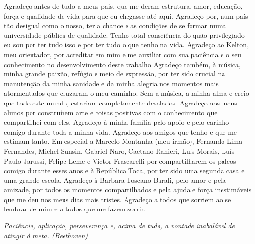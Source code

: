 \documentclass[
	12pt,				%
	openright,			%
	oneside,			%
	a4paper,			%
	english,			%
	french,				%
	spanish,			%
	brazil				%
	]{abntex2}
\begin{document}
\begin{agradecimentos}
Agradeço antes de tudo a meus pais, que me deram estrutura, amor, educação,
força e qualidade de vida para que eu chegasse até aqui. Agradeço por, num país
tão desigual como o nosso, ter a chance e as condições de se formar numa
universidade pública de qualidade. Tenho total consciência do quão privilegiado
eu sou por ter tudo isso e por ter tudo o que tenho na vida. Agradeço ao Kelton,
meu orientador, por acreditar em mim e me auxiliar com sua paciência e o seu
conhecimento no desenvolvimento deste trabalho Agradeço também, à música, minha
grande paixão, refúgio e meio de expressão, por ter sido crucial na manutenção
da minha sanidade e da minha alegria nos momentos mais atormentados que cruzaram
o meu caminho. Sem a música, a minha alma e creio que todo este mundo, estariam
completamente desolados. Agradeço aos meus alunos por construírem arte e coisas
positivas com o conhecimento que compartilhei com eles. Agradeço à minha família
pelo apoio e pelo carinho comigo durante toda a minha vida. Agradeço aos amigos
que tenho e que me estimam tanto. Em especial a Marcelo Montanha (meu irmão),
Fernando Lima Fernandes, Michel Sunsin, Gabriel Naro, Caetano Ranieri, Luís
Morais, Luís Paulo Jarussi, Felipe Leme e Victor Frascarelli por compartilharem
os palcos comigo durante esses anos e à República Toca, por ter sido uma segunda
casa e uma grande escola. Agradeço à Barbara Toscano Barali, pelo amor e pela
amizade, por todos os momentos compartilhados e pela ajuda e força inestimáveis
que me deu nos meus dias mais tristes. Agradeço a todos que sorriem ao se
lembrar de mim e a todos que me fazem sorrir. \end{agradecimentos}

\begin{epigrafe}
    \vspace*{\fill}
	\begin{flushright}
		\textit{Paciência, aplicação, perseverança e, acima de tudo, a vontade inabalável de atingir à meta. (Beethoven)}
	\end{flushright}
\end{epigrafe}

\end{document}
